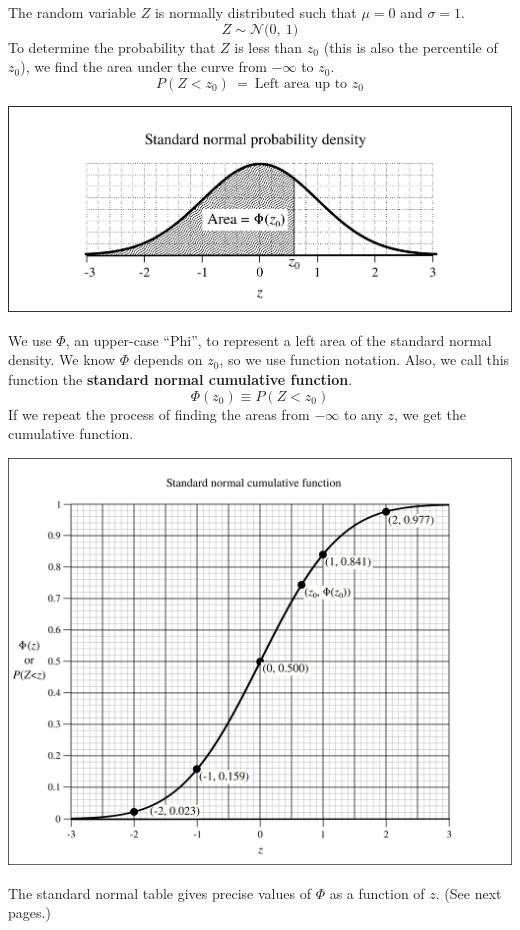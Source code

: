 \documentclass[12pt,letterpaper]{article}
\newcommand{\N}[2]{\mathcal{N}\Big(#1,~ #2\Big)}
\begin{document}
The random variable $Z$ is normally distributed such that $\mu=0$ and $\sigma=1$. 
$$Z\sim \N{0}{1} $$
To determine the probability that $Z$ is less than $z_0$ (this is also the percentile of $z_0$), we find the area under the curve from $-\infty$ to $z_0$.
$$P(Z<z_0) ~=~ \text{Left area up to }z_0 $$
\begin{center}
\includegraphics[scale=.85]{snpdarea2.png}
\end{center}
We use $\Phi$, an upper-case ``Phi'', to represent a left area of the standard normal density. We know $\Phi$ depends on $z_0$, so we use function notation. Also, we call this function the {\bf standard normal cumulative function}.
$$\Phi(z_0) \equiv P(Z<z_0) $$
If we repeat the process of finding the areas from $-\infty$ to any $z$, we get the cumulative function. 
\begin{center}
\includegraphics[scale=.65]{sncd2.png}
\end{center}
The standard normal table gives precise values of $\Phi$ as a function of $z$. (See next pages.)
\end{document}
